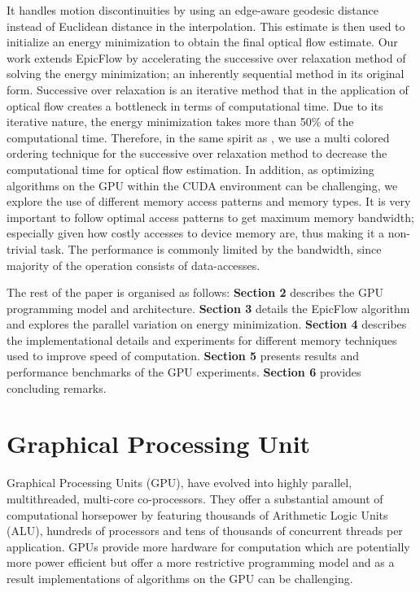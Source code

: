 \documentclass[english]{article}
\begin{document}
	It handles motion discontinuities by using an edge-aware geodesic distance instead of Euclidean distance in the interpolation. This estimate is then used to initialize an energy minimization to obtain the final optical flow estimate. Our work extends EpicFlow by accelerating the successive over relaxation method of solving the energy minimization; an inherently sequential method in its original form. Successive over relaxation is an iterative method that in the application of optical flow creates a bottleneck in terms of computational time. Due to its iterative nature, the energy minimization takes more than 50\% of the computational time. Therefore, in the same spirit as \cite{2}, we use a multi colored ordering technique for the successive over relaxation method to decrease the computational time for optical flow estimation. In addition, as optimizing algorithms on the GPU within the CUDA environment can be challenging, we explore the use of different memory access patterns and memory types. It is very important to follow optimal access patterns to get maximum memory bandwidth; especially given how costly accesses to device memory are, thus making it a non-trivial task. The performance is commonly limited by the bandwidth, since majority of the operation consists of data-accesses.\newline

	The rest of the paper is organised as follows: \textbf{Section 2} describes the GPU programming model and architecture. \textbf{Section 3} details the EpicFlow algorithm and explores the parallel variation on energy minimization. \textbf{Section 4} describes the implementational details and experiments for different memory techniques used to improve speed of computation. \textbf{Section 5} presents results and performance benchmarks of the GPU experiments. \textbf{Section 6} provides concluding remarks.
    
	\section{Graphical Processing Unit}
	Graphical Processing Units (GPU), have evolved into highly parallel, multithreaded, multi-core co-processors. They offer a substantial amount of computational horsepower by featuring thousands of Arithmetic Logic Units (ALU), hundreds of processors and tens of thousands of concurrent threads per application. GPUs provide more hardware for computation which are potentially more power efficient but offer a more restrictive programming model and as a result implementations of algorithms on the GPU can be challenging.
\end{document}
